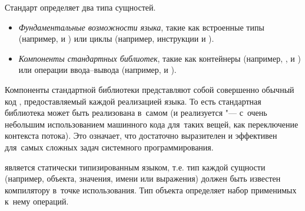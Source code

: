 Стандарт   определяет два типа сущностей.
\begin{itemize}
\item \textit{Фундаментальные возможности языка}, такие как встроенные типы (например,  и ) или циклы (например, инструкции  и ).

\item \textit{Компоненты стандартных библиотек}, такие как контейнеры (например, , и ) или операции ввода--вывода (например, \code{<<} и ).
\end{itemize}

Компоненты стандартной библиотеки представляют собой совершенно обычный код , предоставляемый каждой реализацией языка. То есть стандартная библиотека  может быть реализована в~самом  (и реализуется "--- с~очень небольшим использованием машинного кода для~таких вещей, как переключение контекста потока). Это означает, что  достаточно выразителен и эффективен для~самых сложных задач системного программирования.

 является статически типизированным языком, т.е. тип каждой сущности (например, объекта, значения, имени или выражения) должен быть известен компилятору в~точке использования. Тип объекта определяет набор применимых к~нему операций.



